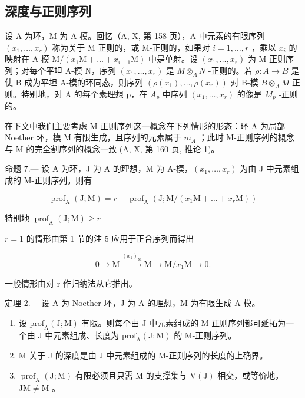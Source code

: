 \subsection{深度与正则序列}

设 A 为环，M 为 A-模。回忆（A, X, 第 158 页），A 中元素的有限序列 \((x_{1},\ldots,x_{r})\) 称为关于 M 正则的，或 M-正则的，如果对 \(i=1,\ldots,r\) ，乘以 \(x_{i}\) 的映射在 A-模 \(\mathrm{M}/(x_{1}\mathrm{M}+\ldots+x_{i-1}\mathrm{M})\) 中是单射。设 \((x_{1},\ldots,x_{r})\) 为 M-正则序列；对每个平坦 A-模 N，序列 \((x_{1},\ldots,x_{r})\) 是 \(M\otimes_{A}N\) -正则的。若 \(\rho:A\to B\) 是使 B 成为平坦 A-模的环同态，则序列 \((\rho(x_{1}),\ldots,\rho(x_{r}))\) 对 B-模 \(B\otimes_{A}M\) 正则。特别地，对 A 的每个素理想 p，在 \(A_{p}\) 中序列 \((x_{1},\ldots,x_{r})\) 的像是 \(M_{p}\) -正则的。

在下文中我们主要考虑 M-正则序列这一概念在下列情形的形态：环 A 为局部 Noether 环，模 M 有限生成，且序列的元素属于 \(m_{A}\) ；此时 M-正则序列的概念与 M 的完全割序列的概念一致 (A, X, 第 160 页, 推论 1)。

命题 7.--- 设 A 为环，J 为 A 的理想，M 为 A-模，\((x_{1},\ldots,x_{r})\) 为由 J 中元素组成的 M-正则序列。则有

\[
\operatorname{prof} _ {\mathrm{A}} (\mathrm{J}; \mathrm{M}) = r + \operatorname{prof} _ {\mathrm{A}} (\mathrm{J}; \mathrm{M} / (x _ {1} \mathrm{M} + \dots + x _ {r} \mathrm{M}))
\]

特别地 \(\operatorname{prof}_{\mathrm{A}}(\mathrm{J};\mathrm{M})\geqslant r\)

\(r=1\) 的情形由第 1 节的注 5 应用于正合序列而得出

\[
0 \rightarrow \mathrm{M} \xrightarrow {(x _ {1}) _ {\mathrm{M}}} \mathrm{M} \longrightarrow \mathrm{M} / x _ {1} \mathrm{M} \rightarrow 0.
\]

一般情形由对 r 作归纳法从它推出。

定理 2.--- 设 A 为 Noether 环，J 为 A 的理想，M 为有限生成 A-模。

\begin{enumerate}
\def\labelenumi{\alph{enumi})}
\item
  设 \(\mathrm{prof}_{\mathrm{A}}(\mathrm{J};\mathrm{M})\) 有限。则每个由 J 中元素组成的 M-正则序列都可延拓为一个由 J 中元素组成、长度为 \(\mathrm{prof}_{\mathrm{A}}(\mathrm{J};\mathrm{M})\) 的 M-正则序列。
\item
  M 关于 J 的深度是由 J 中元素组成的 M-正则序列的长度的上确界。
\item
  \(\operatorname{prof}_{\mathrm{A}}(\mathrm{J};\mathrm{M})\) 有限必须且只需 M 的支撑集与 \(\mathrm{V}(\mathrm{J})\) 相交，或等价地，\(\mathrm{JM} \neq \mathrm{M}\) 。
\end{enumerate}

